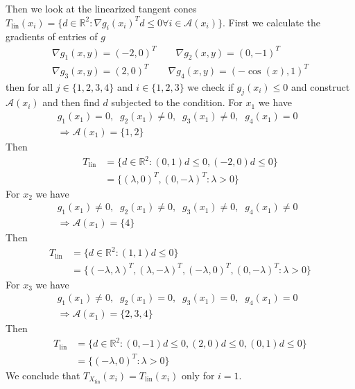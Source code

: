 Then we look at the linearized tangent cones $T_\text{lin}(x_i) = \{d\in \mathbb{R}^{2}:
\nabla g_i(x_i)^{T} d \le 0 \forall i \in \mathcal{A}(x_i)\}$. First we
calculate the gradients of entries of $g$
\begin{align}
    \nabla g_1(x, y) = (-2 ,0)^{T}\qquad \nabla g_2(x,y) = (0, -1)^{T}\\
    \nabla g_3(x, y) = (2 ,0)^{T}\qquad \nabla g_4(x,y) = (-\cos(x), 1)^{T}
\end{align}
then for all $j  \in \{ 1, 2, 3, 4\} $ and $i \in \{1, 2, 3\}$ we check if
$g_j(x_i) \le 0$ and construct $\mathcal{A}(x_i)$ and then find $d$ subjected
to the condition.
For $x_1$ we have
\begin{align}
    g_1(x_1) = 0,\;\;
    g_2(x_1) \neq 0,\;\;
    g_3(x_1) \neq 0,\;\;
    g_4(x_1) = 0 \;\;\\
    \Rightarrow \mathcal{A}(x_1) = \{1, 2\}
\end{align}
Then
\begin{align}
    T_{\text{lin}}
    &= \{d \in \mathbb{R}^{2} : (0, 1)d \le 0, (-2, 0)d \le 0\}\\
    &=\{(\lambda, 0)^{T} , (0, -\lambda)^{T}: \lambda >0 \}
\end{align}
For $x_2$ we have
\begin{align}
    g_1(x_1) \neq 0,\;\;
    g_2(x_1) \neq 0,\;\;
    g_3(x_1) \neq 0,\;\;
    g_4(x_1) \neq 0 \;\;\\
    \Rightarrow \mathcal{A}(x_1) = \{4\}
\end{align}
Then
\begin{align}
    T_{\text{lin}}
    &= \{d \in \mathbb{R}^{2} : (1, 1)d \le 0\}\\
    &=\{(-\lambda, \lambda)^{T} , (\lambda, -\lambda)^{T}, (-\lambda, 0)^{T}, (0,
    -\lambda)^{T}: \lambda >0 \}
\end{align}
For $x_3$ we have
\begin{align}
    g_1(x_1) \neq 0,\;\;
    g_2(x_1) = 0,\;\;
    g_3(x_1) = 0,\;\;
    g_4(x_1) = 0 \;\;\\
    \Rightarrow \mathcal{A}(x_1) = \{2, 3, 4\}
\end{align}
Then
\begin{align}
    T_{\text{lin}}
    &= \{d \in \mathbb{R}^{2} : (0, -1)d \le 0, (2, 0)d\le 0, (0, 1)d \le 0\}\\
    &=\{(-\lambda, 0)^{T}: \lambda >0 \}
\end{align}
We conclude that $T_{X_\text{lin}}(x_i) = T_{\text{lin}}(x_i)$ only for $i=1$.
